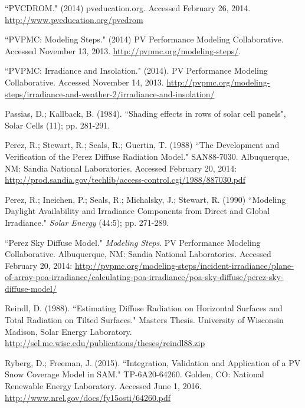 \documentclass[12pt,letterpaper]{article}
\begin{document}
\begin{thebibliography}{99}
 ``PVCDROM." (2014) pveducation.org. Accessed February 26, 2014. \url{http://www.pveducation.org/pvcdrom}

``PVPMC: Modeling Steps." (2014) PV Performance Modeling Collaborative. Accessed November 13, 2013. \url{http://pvpmc.org/modeling-steps/}.

 ``PVPMC: Irradiance and Insolation." (2014). PV Performance Modeling Collaborative. Accessed November 14, 2013. \url{http://pvpmc.org/modeling-steps/irradiance-and-weather-2/irradiance-and-insolation/}

 Passias, D.; Kallback, B.  (1984). ``Shading effects in rows of solar cell panels", Solar Cells (11); pp. 281-291.

 Perez, R.; Stewart, R.; Seals, R.; Guertin, T. (1988) ``The Development and Verification of the Perez Diffuse Radiation Model." SAN88-7030. Albuquerque, NM: Sandia National Laboratories. Accessed February 20, 2014: \url{http://prod.sandia.gov/techlib/access-control.cgi/1988/887030.pdf}

 Perez, R.; Ineichen, P.; Seals, R.; Michalsky, J.; Stewart, R. (1990) ``Modeling Daylight Availability and Irradiance Components from Direct and Global Irradiance." \textit{Solar Energy} (44:5); pp. 271-289.

 ``Perez Sky Diffuse Model."  \textit{Modeling Steps}. PV Performance Modeling Collaborative. Albuquerque, NM: Sandia National Laboratories.  Accessed February 20, 2014: \url{http://pvpmc.org/modeling-steps/incident-irradiance/plane-of-array-poa-irradiance/calculating-poa-irradiance/poa-sky-diffuse/perez-sky-diffuse-model/}

 Reindl, D. (1988). ``Estimating Diffuse Radiation on Horizontal Surfaces and Total Radiation on Tilted Surfaces." Masters Thesis. University of Wisconsin Madison, Solar Energy Laboratory. \url{http://sel.me.wisc.edu/publications/theses/reindl88.zip}

 Ryberg, D.; Freeman, J. (2015). ``Integration, Validation and Application of a PV Snow Coverage Model in SAM." TP-6A20-64260. Golden, CO: National Renewable Energy Laboratory. Accessed June 1, 2016. \url{http://www.nrel.gov/docs/fy15osti/64260.pdf}


\end{thebibliography}
\end{document}
